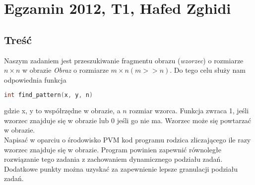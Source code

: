 	\section{Egzamin 2012, T1, Hafed Zghidi}
		\subsection{Treść}
			Naszym zadaniem jest przeszukiwanie fragmentu obrazu (\textit{wzorzec}) o rozmiarze $ n\times n $ w obrazie \textit{Obraz} o rozmiarze $ m\times n (m>>n) $. Do tego celu służy nam odpowiednia funkcja\\
			\begin{lstlisting}[language=C]
			int find_pattern(x, y, n)
			\end{lstlisting}
			gdzie x, y to współrzędne w obrazie, a $ n $ rozmiar wzorca. Funkcja zwraca 1, jeśli wzorzec znajduje się w obrazie lub 0 jeśli go nie ma. Wzorzec może się powtarzać w obrazie.\\
			Napisać w oparciu o środowisko PVM kod programu rodzica zliczającego ile razy wzorzec znajduje się w obrazie. Program powinien zapewnić równoległe rozwiązanie tego zadania z zachowaniem dynamicznego podziału zadań. Dodatkowe punkty można uzyskać za zapewnienie lepsze granulacji podziału zadań.
